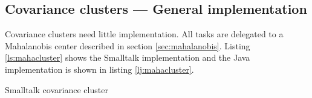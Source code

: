 \documentclass[twoside]{book}
\begin{document}
\subsection{Covariance clusters --- General implementation}
 Covariance clusters need little
implementation. All tasks are delegated to a Mahalanobis center
described in section \ref{sec:mahalanobis}. Listing
\ref{ls:mahacluster} shows the Smalltalk implementation and the
Java implementation is shown in listing \ref{lj:mahacluster}.

\begin{listing} Smalltalk covariance cluster \label{ls:mahacluster}

\end{listing}


\ifx\wholebook\relax\else
\end{document}
